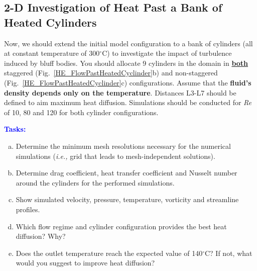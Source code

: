 \documentclass[12pts,a4paper,amsmath,amssymb,floatfix]{article}%
\newcommand{\blue}{\textcolor{blue}}
\newcommand{\ie}{{\it i.e., }}
\newcommand\Rey{\mbox{\textit{Re}}\,\,}
\begin{document}
     \subsection{2-D Investigation of Heat Past a Bank of Heated Cylinders}
     Now, we should extend the initial model configuration to a bank of cylinders (all at constant temperature of 300$^{\circ}$C) to investigate the impact of turbulence induced by bluff bodies. You should allocate 9 cylinders in the domain in \underline{\bf both} staggered (Fig.~\ref{HE_FlowPastHeatedCyclinder}b) and non-staggered (Fig.~\ref{HE_FlowPastHeatedCyclinder}c) configurations. Assume that the {\bf fluid's density depends only on the temperature}. Distances L3-L7 should be defined to aim maximum heat diffusion. Simulations should be conducted for \Rey of 10, 80 and 120 for both cylinder configurations.

     \begin{shaded}
        \begin{center} \blue{\bf Tasks: } \end{center}
        \begin{enumerate}[a)]
           \item Determine the minimum mesh resolutions necessary for the numerical simulations (\ie grid that leads to mesh-independent solutions).
           \item Determine drag coefficient, heat transfer coefficient and Nusselt number around the cylinders for the performed simulations.
           \item Show simulated velocity, pressure, temperature, vorticity and streamline profiles.
           \item Which flow regime and cylinder configuration provides the best heat diffusion? Why?
           \item Does the outlet temperature reach the expected value of 140$^{\circ}$C? If not, what would you suggest to improve heat diffusion?
        \end{enumerate}
     \end{shaded}
\end{document}
